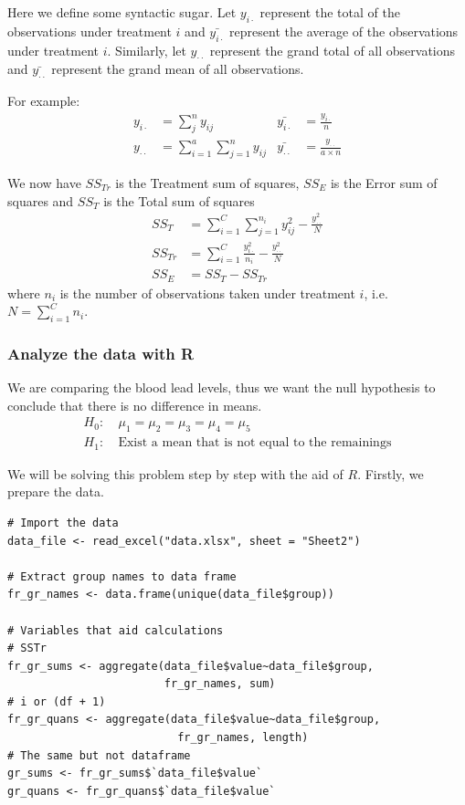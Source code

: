 \documentclass[a4paper]{article}
\numberwithin{equation}{section}
\begin{document}
Here we define some syntactic sugar. Let \(y_{i\cdot}\) represent the total of the observations under treatment \(i\) and \(\bar{y_{i\cdot}}\) represent the average of the observations under treatment \(i\).
Similarly, let \(y_{\cdot\cdot}\) represent the grand total of all observations and \(\bar{y_{\cdot\cdot}}\) represent the grand mean of all observations.

For example:
\begin{align*}
  y_{i\cdot}     & = \sum_{j}^{n} y_{ij}                  & \bar{y_{i\cdot}}     & = \frac{y_{i\cdot}}{n}              \\
  y_{\cdot\cdot} & = \sum_{i=1}^{a} \sum_{j=1}^{n} y_{ij} & \bar{y_{\cdot\cdot}} & = \frac{y_{\cdot\cdot}}{a \times n}
\end{align*}

We now have \(SS_{Tr}\) is the Treatment sum of squares, \(SS_{E}\) is the Error sum of squares and \(SS_{T}\) is the Total sum of squares
\begin{align*}
  SS_{T}  & = \sum_{i=1}^{C} \sum_{j=1}^{n_i} y_{ij}^2 - \frac{y_{\cdot\cdot}^2}{N}  \\
  SS_{Tr} & = \sum_{i=1}^{C} \frac{y_{i\cdot}^{2}}{n_i} - \frac{y_{\cdot\cdot}^2}{N} \\
  SS_{E}  & = SS_{T} - SS_{Tr}
\end{align*}
where \(n_i\) is the number of observations taken under treatment \(i\), i.e. \(N = \sum_{i=1}^{C} n_i\).

\subsubsection{Analyze the data with R}
We are comparing the blood lead levels, thus we want the null hypothesis to conclude that there is no difference in means.
\begin{align*}
  H_0: & \ \mu_1 = \mu_2 = \mu_3 = \mu_4 = \mu_5                   \\
  H_1: & \ \text{Exist a mean that is not equal to the remainings}
\end{align*}

We will be solving this problem step by step with the aid of \(R\).
Firstly, we prepare the data.
\begin{mdframed}[leftline=false,rightline=false,backgroundcolor=magenta!10,nobreak=true]
  \begin{verbatim}
# Import the data
data_file <- read_excel("data.xlsx", sheet = "Sheet2")

# Extract group names to data frame
fr_gr_names <- data.frame(unique(data_file$group))

# Variables that aid calculations
# SSTr
fr_gr_sums <- aggregate(data_file$value~data_file$group,
                        fr_gr_names, sum)
# i or (df + 1)
fr_gr_quans <- aggregate(data_file$value~data_file$group,
                          fr_gr_names, length)
# The same but not dataframe
gr_sums <- fr_gr_sums$`data_file$value`
gr_quans <- fr_gr_quans$`data_file$value`
  \end{verbatim}
\end{mdframed}
\end{document}
